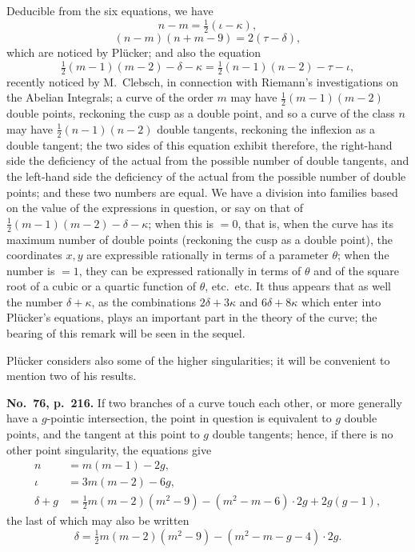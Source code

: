 \documentclass[11pt]{article}
\begin{document}
Deducible from the six equations, we have
\[ n - m = \tfrac{1}{2}(\iota - \kappa), \]
\[ (n - m)(n + m - 9) = 2(\tau - \delta), \]
which are noticed by Pl\"ucker; and also the equation
\[ \tfrac{1}{2}(m-1)(m-2) - \delta - \kappa = \tfrac{1}{2}(n-1)(n-2) - \tau - \iota, \]
recently noticed by M.~Clebsch, in connection with Riemann's investigations on the Abelian Integrals; a curve of the order $m$ may have $\tfrac{1}{2}(m-1)(m-2)$ double points, reckoning the cusp as a double point, and so a curve of the class $n$ may have $\tfrac{1}{2}(n-1)(n-2)$ double tangents, reckoning the inflexion as a double tangent; the two sides of this equation exhibit therefore, the right-hand side the deficiency of the actual from the possible number of double tangents, and the left-hand side the deficiency of the actual from the possible number of double points; and these two numbers are equal. We have a division into families based on the value of the expressions in question, or say on that of $\tfrac{1}{2}(m-1)(m-2) - \delta - \kappa$; when this is $= 0$, that is, when the curve has its maximum number of double points (reckoning the cusp as a double point), the coordinates $x, y$ are expressible rationally in terms of a parameter $\theta$; when the number is $= 1$, they can be expressed rationally in terms of $\theta$ and of the square root of a cubic or a quartic function of $\theta$, etc.~etc. It thus appears that as well the number $\delta + \kappa$, as the combinations $2\delta + 3\kappa$ and $6\delta + 8\kappa$ which enter into Pl\"ucker's equations, plays an important part in the theory of the curve; the bearing of this remark will be seen in the sequel.

Pl\"ucker considers also some of the higher singularities; it will be convenient to mention two of his results.

\medskip
\textbf{No.~76, p.~216.} If two branches of a curve touch each other, or more generally have a $g$-pointic intersection, the point in question is equivalent to $g$ double points, and the tangent at this point to $g$ double tangents; hence, if there is no other point singularity, the equations give
\begin{align*}
n &= m(m-1) - 2g,\\
\iota &= 3m(m-2) - 6g,\\
\delta + g &= \tfrac{1}{2}m(m-2)(m^2 - 9) - (m^2 - m - 6)\cdot 2g + 2g(g - 1),
\end{align*}
the last of which may also be written
\[ \delta = \tfrac{1}{2}m(m-2)(m^2 - 9) - (m^2 - m - g - 4)\cdot 2g. \]
\end{document}
